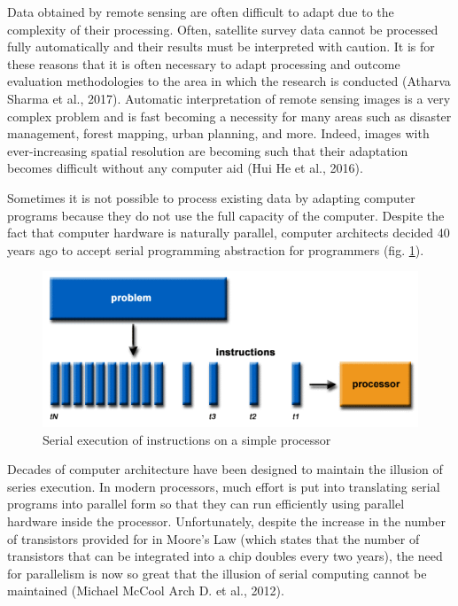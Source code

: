 {{	Data obtained by remote sensing are often difficult to adapt due to the complexity of their processing. Often, satellite survey data cannot be processed fully automatically and their results must be interpreted with caution. It is for these reasons that it is often necessary to adapt processing and outcome evaluation methodologies to the area in which the research is conducted (Atharva Sharma et al., 2017).
	Automatic interpretation of remote sensing images is a very complex problem and is fast becoming a necessity for many areas such as disaster management, forest mapping, urban planning, and more. Indeed, images with ever-increasing spatial resolution are becoming such that their adaptation becomes difficult without any computer aid (Hui He et al., 2016).
	
	Sometimes it is not possible to process existing data by adapting computer programs because they do not use the full capacity of the computer. Despite the fact that computer hardware is naturally parallel, computer architects decided 40 years ago to accept serial programming abstraction for programmers (fig. \ref{fig:seq_exec}).
	
	\begin{figure}[H]
		\centering
		\includegraphics[width=0.9\linewidth]{images/seq_exec.png}
		\caption{Serial execution of instructions on a simple processor}
		\label{fig:seq_exec}
	\end{figure}

	Decades of computer architecture have been designed to maintain the illusion of series execution. In modern processors, much effort is put into translating serial programs into parallel form so that they can run efficiently using parallel hardware inside the processor. Unfortunately, despite the increase in the number of transistors provided for in Moore's Law (which states that the number of transistors that can be integrated into a chip doubles every two years), the need for parallelism is now so great that the illusion of serial computing cannot be maintained (Michael McCool Arch D. et al., 2012).
	
}}
